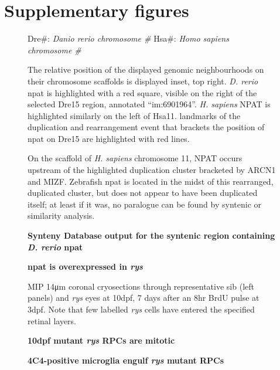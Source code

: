 \section{Supplementary figures}

\begin{sidewaysfigure}[!h]
    \caption{{\bf Synteny Database output for the syntenic region containing \textit{D. rerio} npat}}
    Dre\#: \textit{Danio rerio chromosome \#}
    Hsa\#: \textit{Homo sapiens chromosome \#}

    The relative position of the displayed genomic neighbourhoods on their chromosome scaffolds is displayed inset, top right. \textit{D. rerio} npat is highlighted with a red square, visible on the right of the selected Dre15 region, annotated ``im:6901964''. \textit{H. sapiens} NPAT is highlighted similarly on the left of Hsa11. landmarks of the duplication and rearrangement event that brackets the position of npat on Dre15 are highlighted with red lines.

    On the scaffold of \textit{H. sapiens} chromosome 11, NPAT occurs upstream of the highlighted duplication cluster bracketed by ARCN1 and MIZF. Zebrafish npat is located in the midst of this rearranged, duplicated cluster, but does not appear to have been duplicated itself; at least if it was, no paralogue can be found by syntenic or similarity analysis.
    \label{synteny}
\end{sidewaysfigure}


\begin{figure}[!h]
    \caption{{\bf npat is overexpressed in \textit{rys}}} 
    \label{npatrtpcr}
\end{figure}

\begin{figure}[!h]
    \caption{{\bf 10dpf mutant \textit{rys} RPCs are mitotic}} MIP 14\si{\micro\metre} coronal cryosections through representative sib (left panels) and \textit{rys} eyes at 10dpf, 7 days after an 8hr BrdU pulse at 3dpf. Note that few labelled \textit{rys} cells have entered the specified retinal layers.
    \label{rysmitosis}
\end{figure}

\begin{figure}[!h]
    \caption{{\bf 4C4-positive microglia engulf \textit{rys} mutant RPCs}} 
    \label{phagocytosis}
\end{figure}


